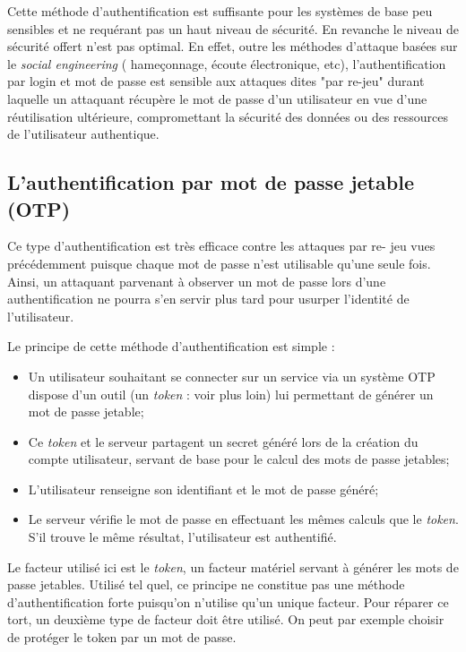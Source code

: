 	Cette méthode d'authentification est suffisante pour les systèmes de base
	peu sensibles et ne requérant pas un haut niveau de sécurité.	En
	revanche le niveau de sécurité offert n'est pas optimal. En effet, outre
	les méthodes d'attaque basées sur le \emph{social engineering} (
	hameçonnage, écoute électronique, etc), l'authentification par login et
	mot de passe est sensible aux attaques dites "par re-jeu" durant laquelle
	un attaquant récupère le mot de passe d'un utilisateur en vue d'une
	réutilisation ultérieure, compromettant la sécurité des données ou des
	ressources de l'utilisateur authentique.

\subsection{L'authentification par mot de passe jetable (OTP)}

	Ce type d'authentification est très efficace contre les attaques par re-
	jeu vues précédemment puisque chaque mot de passe n'est utilisable qu'une
	seule fois. Ainsi, un attaquant parvenant à observer un mot de passe lors
	d'une authentification ne pourra s'en servir plus tard pour usurper
	l'identité de l'utilisateur.

	Le principe de cette méthode d'authentification est simple :
	\begin{itemize}
		\item Un utilisateur souhaitant se connecter sur un service via un
		système OTP dispose d'un outil (un \emph{token} : voir plus loin) lui
		permettant de générer un mot de passe jetable;

		\item Ce \emph{token} et le serveur partagent un secret généré lors de
		la création du compte utilisateur, servant de base pour le calcul des
		mots de passe jetables;
		\item L'utilisateur renseigne son identifiant et le mot de passe
		généré;
		\item Le serveur vérifie le mot de passe en effectuant les mêmes
		calculs que le \emph{token}. S'il trouve le même résultat,
		l'utilisateur est authentifié.
	\end{itemize}

	Le facteur utilisé ici est le \emph{token}, un facteur matériel servant à
	générer les mots de passe jetables. Utilisé tel quel, ce principe ne
	constitue pas une méthode d'authentification forte puisqu'on n'utilise
	qu'un unique facteur. Pour réparer ce tort, un deuxième type de facteur
	doit être utilisé. On peut par exemple choisir de protéger le token par un
	mot de passe.

